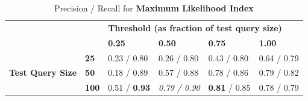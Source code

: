\documentclass[12pt]{IEEEtran}
\begin{document}
\begin{table}[]
\centering
\caption{Precision / Recall for \textbf{Maximum Likelihood Index}}
\label{ml}
\begin{tabular}{ll|llll}
\cline{3-6}
                                                       &              & \multicolumn{4}{l|}{\textbf{Threshold (as fraction of test query size)}}                                                                          \\ \cline{3-6} 
\textbf{}                                              &              & \multicolumn{1}{l|}{\textbf{0.25}} & \multicolumn{1}{l|}{\textbf{0.50}} & \multicolumn{1}{l|}{\textbf{0.75}} & \multicolumn{1}{l|}{\textbf{1.00}} \\ \hline
\multicolumn{1}{|l|}{\multirow{3}{*}{\textbf{Test Query Size}}} & \textbf{25}  & 0.23 / 0.80                         & 0.26 / 0.80                         & 0.43 / 0.80                        & 0.64 / 0.79                        \\ \cline{2-2}
\multicolumn{1}{|l|}{}                                 & \textbf{50}  & 0.18 / 0.89                        & 0.57 / 0.88                         & 0.78 / 0.86                         & 0.79 / 0.82                        \\ \cline{2-2}
\multicolumn{1}{|l|}{}                                 & \textbf{100} & 0.51 / \textbf{0.93}                          & \emph{0.79 / 0.90}                      & \textbf{0.81} / 0.85                         & 0.78 / 0.79                          \\ \cline{1-2}
\end{tabular}
\end{table}
\end{document}
